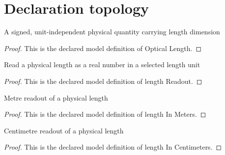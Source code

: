 \section{Declaration topology}
\begin{definition}
  \label{def:physics:phyx-mini-0249:phyxminiproblems-problemphyxmini0249-opticallength}
  A signed, unit-independent physical quantity carrying length dimension
\end{definition}
\begin{proof}
  This is the declared model definition of Optical Length.
\end{proof}
\begin{definition}
  \label{def:physics:phyx-mini-0249:phyxminiproblems-problemphyxmini0249-lengthreadout}
  Read a physical length as a real number in a selected length unit
\end{definition}
\begin{proof}
  This is the declared model definition of length Readout.
\end{proof}
\begin{definition}
  \label{def:physics:phyx-mini-0249:phyxminiproblems-problemphyxmini0249-lengthinmeters}
  Metre readout of a physical length
\end{definition}
\begin{proof}
  This is the declared model definition of length In Meters.
\end{proof}
\begin{definition}
  \label{def:physics:phyx-mini-0249:phyxminiproblems-problemphyxmini0249-lengthincentimeters}
  Centimetre readout of a physical length
\end{definition}
\begin{proof}
  This is the declared model definition of length In Centimeters.
\end{proof}
